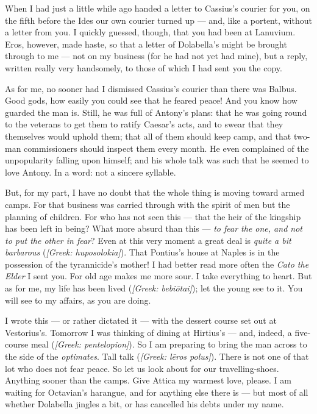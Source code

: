 

 When I had just a little while ago handed a letter to Cassius's courier for you, on the fifth before the Ides our own courier turned up --- and, like a portent, without a letter from you. I quickly guessed, though, that you had been at Lanuvium. Eros, however, made haste, so that a letter of Dolabella's might be brought through to me --- not on my business (for he had not yet had mine), but a reply, written really very handsomely, to those of which I had sent you the copy.

 As for me, no sooner had I dismissed Cassius's courier than there was Balbus. Good gods, how easily you could see that he feared peace! And you know how guarded the man is. Still, he was full of Antony's plans: that he was going round to the veterans to get them to ratify Caesar's acts, and to swear that they themselves would uphold them; that all of them should keep camp, and that two-man commissioners should inspect them every month. He even complained of the unpopularity falling upon himself; and his whole talk was such that he seemed to love Antony. In a word: not a sincere syllable.

 But, for my part, I have no doubt that the whole thing is moving toward armed camps. For that business was carried through with the spirit of men but the planning of children. For who has not seen this --- that the heir of the kingship has been left in being? What more absurd than this --- \textit{to fear the one, and not to put the other in fear}? Even at this very moment a great deal is \textit{quite a bit barbarous} (\textit{[Greek: huposolokia]}). That Pontius's house at Naples is in the possession of the tyrannicide's mother! I had better read more often the \textit{Cato the Elder} I sent you. For old age makes me more sour. I take everything to heart. But as for me, my life has been lived (\textit{[Greek: bebi\=otai]}); let the young see to it. You will see to my affairs, as you are doing.

 I wrote this --- or rather dictated it --- with the dessert course set out at Vestorius's. Tomorrow I was thinking of dining at Hirtius's --- and, indeed, a five-course meal (\textit{[Greek: pentelopion]}). So I am preparing to bring the man across to the side of the \textit{optimates}. Tall talk (\textit{[Greek: l\=eros polus]}). There is not one of that lot who does not fear peace. So let us look about for our travelling-shoes. Anything sooner than the camps. Give Attica my warmest love, please. I am waiting for Octavian's harangue, and for anything else there is --- but most of all whether Dolabella jingles a bit, or has cancelled his debts under my name.
